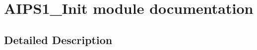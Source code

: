 \hypertarget{group___a_i_p_s1___init__module}{}\section{A\+I\+P\+S1\+\_\+\+Init module documentation}
\label{group___a_i_p_s1___init__module}


\subsection{Detailed Description}
